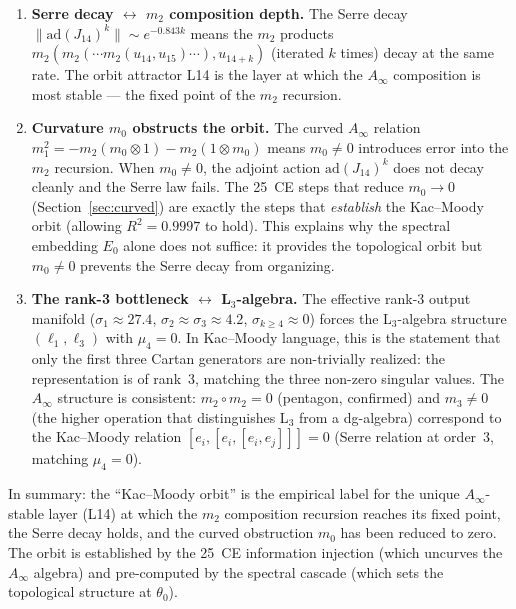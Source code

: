 \documentclass[11pt]{amsart}
\begin{document}
\begin{enumerate}
\item \textbf{Serre decay $\leftrightarrow$ $m_2$ composition depth.}
  The Serre decay $\|\mathrm{ad}(J_{14})^k\| \sim e^{-0.843k}$
  means the $m_2$ products
  $m_2(m_2(\cdots m_2(u_{14}, u_{15})\cdots), u_{14+k})$
  (iterated $k$ times) decay at the same rate.
  The orbit attractor L14 is the layer at which the $A_\infty$
  composition is most stable --- the fixed point of the $m_2$
  recursion.

\item \textbf{Curvature $m_0$ obstructs the orbit.}
  The curved $A_\infty$ relation $m_1^2 = -m_2(m_0 \otimes 1)
  - m_2(1 \otimes m_0)$ means $m_0 \neq 0$ introduces error
  into the $m_2$ recursion.
  When $m_0 \neq 0$, the adjoint action $\mathrm{ad}(J_{14})^k$
  does not decay cleanly and the Serre law fails.
  The 25~CE steps that reduce $m_0 \to 0$ (Section~\ref{sec:curved})
  are exactly the steps that \emph{establish} the Kac--Moody orbit
  (allowing $R^2 = 0.9997$ to hold).
  This explains why the spectral embedding $E_0$ alone does not
  suffice: it provides the topological orbit but $m_0 \neq 0$
  prevents the Serre decay from organizing.

\item \textbf{The rank-3 bottleneck $\leftrightarrow$ L$_3$-algebra.}
  The effective rank-3 output manifold
  ($\sigma_1 \approx 27.4$, $\sigma_2 \approx \sigma_3 \approx 4.2$,
  $\sigma_{k\geq 4} \approx 0$) forces the L$_3$-algebra structure
  $(\ell_1, \ell_3)$ with $\mu_4 = 0$.
  In Kac--Moody language, this is the statement that only the first
  three Cartan generators are non-trivially realized: the
  representation is of rank~3, matching the three non-zero
  singular values.
  The $A_\infty$ structure is consistent: $m_2 \circ m_2 = 0$
  (pentagon, confirmed) and $m_3 \neq 0$ (the higher operation
  that distinguishes L$_3$ from a dg-algebra) correspond to
  the Kac--Moody relation $[e_i, [e_i, [e_i, e_j]]] = 0$
  (Serre relation at order~3, matching $\mu_4 = 0$).
\end{enumerate}

In summary: the ``Kac--Moody orbit'' is the empirical label for
the unique $A_\infty$-stable layer (L14) at which the $m_2$
composition recursion reaches its fixed point, the Serre decay
holds, and the curved obstruction $m_0$ has been reduced to zero.
The orbit is established by the 25~CE information injection
(which uncurves the $A_\infty$ algebra) and pre-computed by the
spectral cascade (which sets the topological structure at $\theta_0$).
\end{document}

